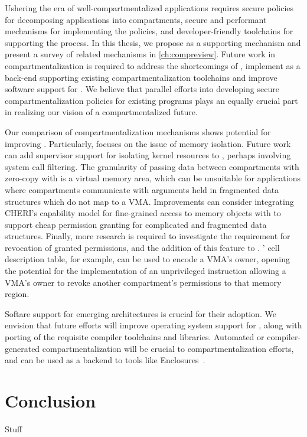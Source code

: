 Ushering the era of well-compartmentalized applications requires 
secure policies for decomposing applications into compartments,
secure and performant mechanisms for implementing the policies, and
developer-friendly toolchains for supporting the process.
In this thesis, we propose \seccells as a supporting mechanism and
present a survey of related mechanisms in \autoref{ch:compreview}.
Future work in compartmentalization is required to address the
shortcomings of \seccells, implement \seccells as a back-end supporting
existing compartmentalization toolchains and
improve software support for \seccells.
We believe that parallel efforts into developing secure compartmentalization
policies for existing programs plays an equally crucial part in realizing
our vision of a compartmentalized future.

Our comparison of compartmentalization mechanisms shows potential
for improving \seccells.
Particularly, \seccells focuses on the issue of memory isolation.
Future work can add supervisor support for isolating kernel resources
to \seccells, perhaps involving system call filtering.
The granularity of passing data between compartments with zero-copy with
\seccells is a virtual memory area, which can be unsuitable for 
applications where compartments communicate with arguments held in 
fragmented data structures which do not map to a VMA.
Improvements can consider integrating CHERI's capability model for
fine-grained access to memory objects with \seccells to support cheap 
permission granting for complicated and fragmented data structures.
Finally, more research is required to investigate the requirement for
revocation of granted permissions, and the addition of this feature
to \seccells.
\seccells' cell description table, for example, can be used to encode
a VMA's owner, opening the potential for the implementation of an
unprivileged instruction allowing a VMA's owner to revoke another
compartment's permissions to that memory region.

Softare support for emerging architectures is crucial for their adoption.
We envision that future efforts will improve operating system support for
\seccells, along with porting of the requisite compiler toolchains and
libraries.
Automated or compiler-generated compartmentalization will be crucial to
compartmentalization efforts, and \seccells can be used as a backend to
tools like Enclosures~\cite{GhosnKPLB21}.







\section{Conclusion}
\label{sec:conclusion:conclusion}
Stuff

